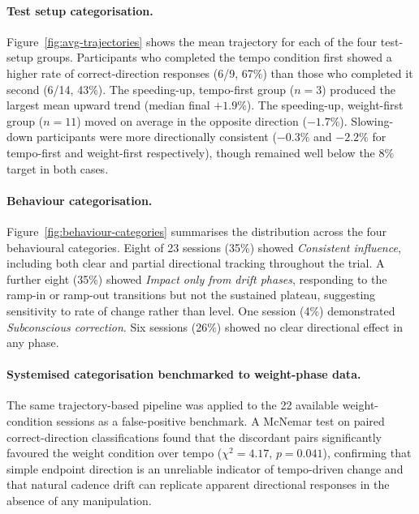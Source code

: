 \paragraph{Test setup categorisation.}

Figure~\ref{fig:avg-trajectories} shows the mean trajectory for each of the
four test-setup groups.
Participants who completed the tempo condition first showed a higher rate of
correct-direction responses (6/9, 67\%) than those who completed it second
(6/14, 43\%).
The speeding-up, tempo-first group ($n = 3$) produced the largest mean
upward trend (median final $+1.9\%$).
The speeding-up, weight-first group ($n = 11$) moved on average in the
opposite direction ($-1.7\%$).
Slowing-down participants were more directionally consistent
($-0.3\%$ and $-2.2\%$ for tempo-first and weight-first respectively),
though remained well below the 8\% target in both cases.

\paragraph{Behaviour categorisation.}

Figure~\ref{fig:behaviour-categories} summarises the distribution across
the four behavioural categories.
Eight of 23 sessions (35\%) showed \textit{Consistent influence},
including both clear and partial directional tracking throughout the trial.
A further eight (35\%) showed \textit{Impact only from drift phases},
responding to the ramp-in or ramp-out transitions but not the sustained
plateau, suggesting sensitivity to rate of change rather than level.
One session (4\%) demonstrated \textit{Subconscious correction}.
Six sessions (26\%) showed no clear directional effect in any phase.

\paragraph{Systemised categorisation benchmarked to weight-phase data.}

The same trajectory-based pipeline was applied to the 22 available
weight-condition sessions as a false-positive benchmark.
A McNemar test on paired correct-direction classifications found that
the discordant pairs significantly favoured the weight condition over
tempo ($\chi^2 = 4.17$, $p = 0.041$), confirming that simple
endpoint direction is an unreliable indicator of tempo-driven change
and that natural cadence drift can replicate apparent directional
responses in the absence of any manipulation.

